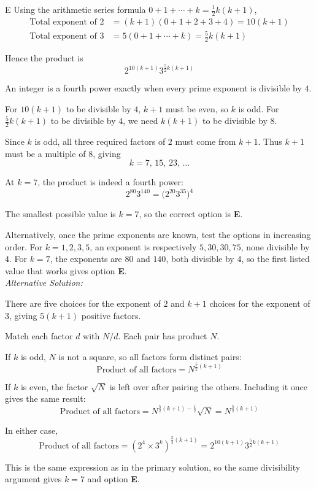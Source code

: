 \documentclass[11pt,a4paper]{article}
\begin{document}
\begin{enumerate}[label=\textbf{\arabic*.},leftmargin=*,itemsep=0pt,start=15]
\begin{djsSolution}{E}
Using the arithmetic series formula $0+1+\cdots+k=\frac12 k(k+1)$,
\[
\begin{aligned}
\text{Total exponent of }2
&=(k+1)(0+1+2+3+4)=10(k+1)\\[8pt]
\text{Total exponent of }3
&=5(0+1+\cdots+k)=\frac{5}{2}k(k+1)
\end{aligned}
\]

Hence the product is
\[
2^{10(k+1)}3^{\frac{5}{2}k(k+1)}
\]

An integer is a fourth power exactly when every prime exponent is divisible by $4$.

For $10(k+1)$ to be divisible by $4$, $k+1$ must be even, so $k$ is odd. For $\frac{5}{2}k(k+1)$ to be divisible by $4$, we need $k(k+1)$ to be divisible by $8$.

Since $k$ is odd, all three required factors of $2$ must come from $k+1$. Thus $k+1$ must be a multiple of $8$, giving
\[
k=7,\,15,\,23,\,\ldots
\]

At $k=7$, the product is indeed a fourth power:
\[
2^{80}3^{140}=\bigl(2^{20}3^{35}\bigr)^4
\]

The smallest possible value is $k=7$, so the correct option is \textbf{E}.

Alternatively, once the prime exponents are known, test the options in increasing order. For $k=1,2,3,5$, an exponent is respectively $5,30,30,75$, none divisible by $4$. For $k=7$, the exponents are $80$ and $140$, both divisible by $4$, so the first listed value that works gives option \textbf{E}.\\[5pt]

\textit{Alternative Solution:}

There are five choices for the exponent of $2$ and $k+1$ choices for the exponent of $3$, giving $5(k+1)$ positive factors.

Match each factor $d$ with $N/d$. Each pair has product $N$.

If $k$ is odd, $N$ is not a square, so all factors form distinct pairs:
\[
\text{Product of all factors}=N^{\frac{5}{2}(k+1)}
\]

If $k$ is even, the factor $\sqrt N$ is left over after pairing the others. Including it once gives the same result:
\[
\text{Product of all factors}
=N^{\frac{5}{2}(k+1)-\frac{1}{2}}\sqrt N
=N^{\frac{5}{2}(k+1)}
\]

In either case,
\[
\text{Product of all factors}
=(2^4\times3^k)^{\frac{5}{2}(k+1)}
=2^{10(k+1)}3^{\frac{5}{2}k(k+1)}
\]

This is the same expression as in the primary solution, so the same divisibility argument gives $k=7$ and option \textbf{E}.
\end{djsSolution}
\end{enumerate}
\end{document}
